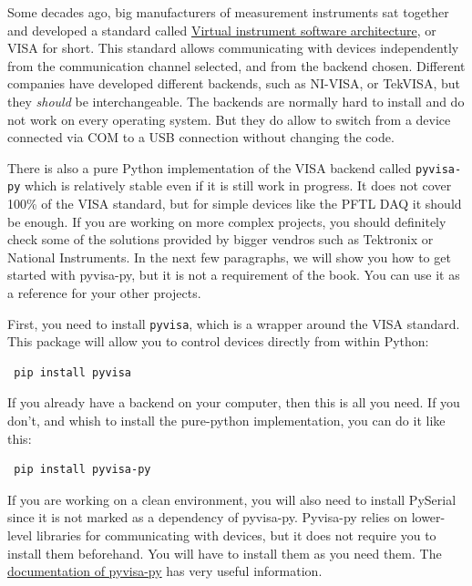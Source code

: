 Some decades ago, big manufacturers of measurement instruments sat together and developed a standard called \href{https://en.wikipedia.org/wiki/Virtual_instrument_software_architecture}{Virtual instrument software architecture}, or VISA for short. This standard allows communicating with devices independently from the communication channel selected, and from the backend chosen. Different companies have developed different backends, such as NI-VISA, or TekVISA, but they \emph{should} be interchangeable. The backends are normally hard to install and do not work on every operating system. But they do allow to switch from a device connected via COM to a USB connection without changing the code. 

There is also a pure Python implementation of the VISA backend called \texttt{pyvisa-py} which is relatively stable even if it is still work in progress. It does not cover 100\% of the VISA standard, but for simple devices like the {PFTL DAQ} it should be enough. If you are working on more complex projects, you should definitely check some of the solutions provided by bigger vendros such as Tektronix or National Instruments. In the next few paragraphs, we will show you how to get started with pyvisa-py, but it is not a requirement of the book. You can use it as a reference for your other projects. 

First, you need to install \texttt{pyvisa}, which is a wrapper around the VISA standard. This package will allow you to control devices directly from within Python: 

\begin{verbatim}
 pip install pyvisa
\end{verbatim}

If you already have a backend on your computer, then this is all you need. If you don't, and whish to install the pure-python implementation, you can do it like this:

\begin{verbatim}
 pip install pyvisa-py
\end{verbatim}

If you are working on a clean environment, you will also need to install PySerial since it is not marked as a dependency of pyvisa-py. Pyvisa-py relies on lower-level libraries for communicating with devices, but it does not require you to install them beforehand. You will have to install them as you need them. The \href{https://pyvisa-py.readthedocs.io/en/latest/}{documentation of pyvisa-py} has very useful information. 

